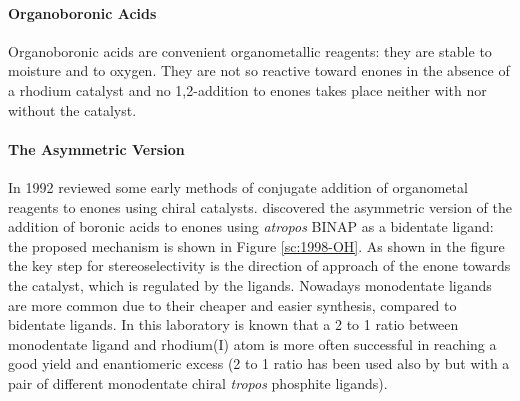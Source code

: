 \paragraph{Organoboronic Acids} Organoboronic acids are convenient organometallic reagents: they are stable to moisture and to oxygen. They are not so reactive toward enones in the absence of a rhodium catalyst and no 1,2-addition to enones takes place neither with nor without the catalyst. 


\paragraph{The Asymmetric Version} In 1992 \citet{Rossiter1992} reviewed some early methods of conjugate addition of organometal reagents to enones using chiral catalysts.  %
\citet{Miyaura1998} discovered the asymmetric version of the addition of boronic acids to enones using \emph{atropos} BINAP %
as a bidentate ligand: the proposed mechanism is shown in Figure \ref{sc:1998-OH}. As shown in the figure the key step for stereoselectivity is the direction of approach of the enone towards the catalyst, which is regulated by the ligands. Nowadays monodentate ligands are more common due to their cheaper and easier synthesis, compared to bidentate ligands. 
In this laboratory is known that a 2 to 1 ratio between monodentate ligand and rhodium(I) atom is more often successful in reaching a good yield and enantiomeric excess (2 to 1 ratio has been used also by \citet{Gennari2007} 
but with a pair of different monodentate chiral \emph{tropos} phosphite ligands).
\ifpdf
